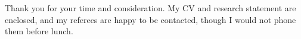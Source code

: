 
Thank you for your time and consideration. My CV and research statement are enclosed, and my referees are happy to be contacted, though I would not phone them before lunch.

